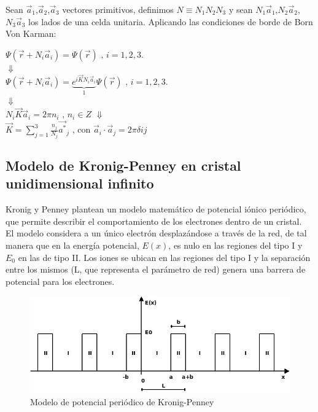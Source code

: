 \documentclass[oneside]{book}
\numberwithin{equation}{section}
\numberwithin{figure}{section}
\numberwithin{table}{section}
\begin{document}
				Sean $\vec{a}_1$,$\vec{a}_2$,$\vec{a}_3$ vectores primitivos, definimos $N \equiv N_1 N_2 N_3$ y sean $N_1 \vec{a}_1$,$N_2 \vec{a}_2$,$N_3 \vec{a}_3$ los lados de una celda unitaria. Aplicando las condiciones de borde de Born Von Karman:
				
				\begin{center}
					$\displaystyle \Psi(\vec{r}+N_i \vec{a}_i)=\Psi(\vec{r}) \text{  ,   } i=1,2,3.$\\
					$\Downarrow$\\				
					$\displaystyle \Psi(\vec{r}+N_i \vec{a}_i)=\underbrace{e^{i \vec{K} N_i \vec{a}_i}}_1 \Psi(\vec{r}) \text{  ,   } i=1,2,3.$\\
					$\Downarrow$\\
					$\displaystyle N_i \vec{K} \vec{a}_i=2\pi n_i \text{ , } n_i \in{Z}$
					$\Downarrow$\\
					$\displaystyle \vec{K}=\sum_{j=1}^3 \frac{n_j}{N_j}\vec{a^*}_j \text{ , con } \vec{a}_i \cdot \vec{a}_j=2\pi \delta{i j}$
				\end{center}
			
			\subsection{Modelo de Kronig-Penney en cristal unidimensional infinito}
			
				Kronig y Penney plantean un modelo matemático de potencial iónico periódico, que permite describir el comportamiento de los electrones dentro de un cristal.\\
				
				El modelo considera a un único electrón desplazándose a través de la red, de tal manera que en la energía potencial, $E(x)$, es nulo en las
regiones del tipo I y $E_0$ en las de tipo II. Los iones se ubican en las regiones del tipo I y la separación entre los mismos (L, que representa el parámetro de red) genera una barrera de potencial para los electrones.
			
				\begin{figure}[H]
					\begin{center}
						\includegraphics[scale=0.7]{Penney.jpeg}
						\caption{Modelo de potencial periódico de Kronig-Penney}
					\end{center}					
				\end{figure}	
			
\end{document}
